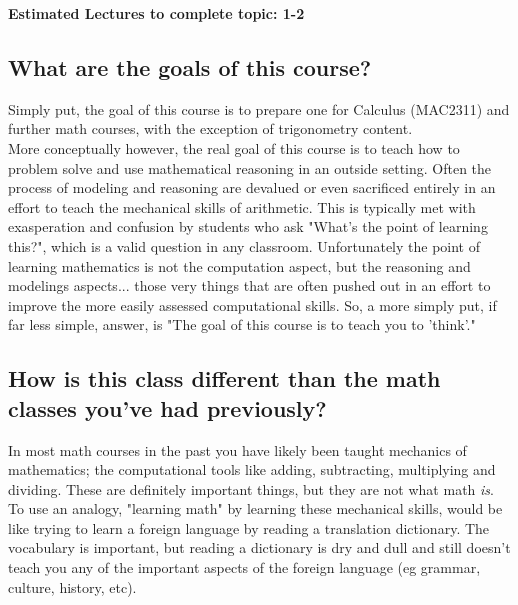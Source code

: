 
\ifcompletedNotes
{}
\textbf{Estimated Lectures to complete topic: 1-2}
\fi


\subsection{What are the goals of this course?}
Simply put, the goal of this course is to prepare one for Calculus (MAC2311) and further math courses, with the exception of trigonometry content. \\

More conceptually however, the real goal of this course is to teach how to problem solve and use mathematical reasoning in an outside setting. Often the process of modeling and reasoning are devalued or even sacrificed entirely in an effort to teach the mechanical skills of arithmetic. This is typically met with exasperation and confusion by students who ask "What's the point of learning this?", which is a valid question in any classroom. Unfortunately the point of learning mathematics is not the computation aspect, but the reasoning and modelings aspects... those very things that are often pushed out in an effort to improve the more easily assessed computational skills. So, a more simply put, if far less simple, answer, is "The goal of this course is to teach you to 'think'." 

\subsection{How is this class different than the math classes you've had previously?}
In most math courses in the past you have likely been taught mechanics of mathematics; the computational tools like adding, subtracting, multiplying and dividing. These are definitely important things, but they are not what math \textit{is}. To use an analogy, "learning math" by learning these mechanical skills, would be like trying to learn a foreign language by reading a translation dictionary. The vocabulary is important, but reading a dictionary is dry and dull and still doesn't teach you any of the important aspects of the foreign language (eg grammar, culture, history, etc).

